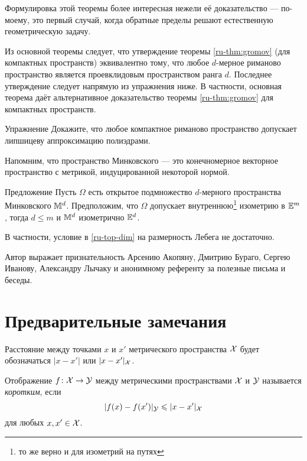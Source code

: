 \documentclass[oneside,a4paper]{article}
\begin{document}
Формулировка этой теоремы более интересная нежели её доказательство ---  по-моему, это первый случай, когда обратные пределы решают естественную геометрическую задачу.

Из основной теоремы следует, что утверждение теоремы \ref{ru-thm:gromov} (для компактных пространств) эквивалентно 
тому, что любое $d$-мерное риманово пространство является проевклидовым пространством ранга $d$.
Последнее утверждение следует напрямую из упражнения ниже.
В частности, основная теорема даёт альтернативное доказательство теоремы  \ref{ru-thm:gromov} для компактных пространств.

\begin{thm}{Упражнение}
Докажите, что любое компактное риманово пространство допускает липшицеву аппроксимацию полиэдрами.
\end{thm}


Напомним, что пространство Минковского --- это конечномерное векторное пространство с метрикой, индуцированной некоторой нормой.

\begin{thm}{Предложение}\label{ru-minkowski}
Пусть $\Omega$ есть открытое подмножество $d$-мерного пространства Минковского $\mathbb{M}^d$.
Предположим, что $\Omega$ допускает внутреннюю\footnote{то же верно и для изометрий на путях} изометрию в $\mathbb{E}^m$, тогда $d\le m$ и $\mathbb{M}^d$ изометрично $\mathbb{E}^d$.
\end{thm}
В частности, условие в \ref{ru-top-dim} на размерность Лебега не достаточно.

\smallskip

{\sloppy

Автор выражает признательность Арсению Акопяну, Дмитрию Бураго, Сергею Иванову, Александру Лычаку и анонимному референту за полезные письма и беседы.

}






\section{Предварительные замечания}\label{ru-preliminaries}

Расстояние между точками $x$ и $x'$ метрического пространства $\mathcal{X}$ будет обозначаться $|x -x'|$ или $|x -x'|_{\mathcal{X}}$.

Отображение $f\colon\mathcal{X}\to \mathcal{Y}$ между метрическими пространствами $\mathcal{X}$ и $\mathcal{Y}$ называется \emph{коротким},
если  
$$|f(x)-f(x')|_{\mathcal{Y}}\leqslant |x -x'|_{\mathcal{X}}$$
для любых $x,x'\in \mathcal{X}$.
\end{document}
